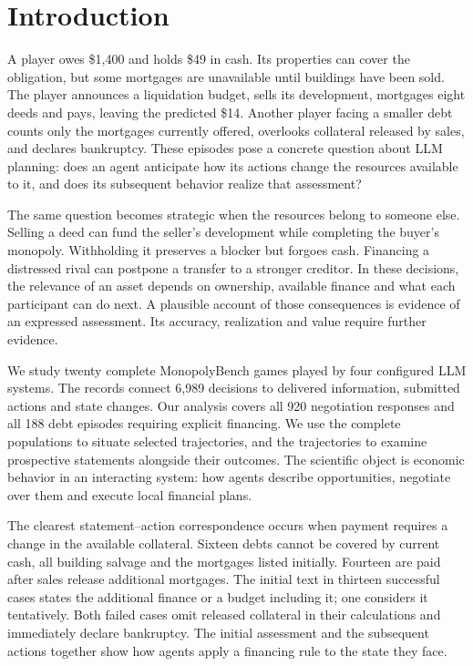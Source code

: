 \section{Introduction}

A player owes \$1,400 and holds \$49 in cash. Its properties can cover the obligation, but some mortgages are unavailable until buildings have been sold. The player announces a liquidation budget, sells its development, mortgages eight deeds and pays, leaving the predicted \$14. Another player facing a smaller debt counts only the mortgages currently offered, overlooks collateral released by sales, and declares bankruptcy. These episodes pose a concrete question about LLM planning: does an agent anticipate how its actions change the resources available to it, and does its subsequent behavior realize that assessment?

The same question becomes strategic when the resources belong to someone else. Selling a deed can fund the seller's development while completing the buyer's monopoly. Withholding it preserves a blocker but forgoes cash. Financing a distressed rival can postpone a transfer to a stronger creditor. In these decisions, the relevance of an asset depends on ownership, available finance and what each participant can do next. A plausible account of those consequences is evidence of an expressed assessment. Its accuracy, realization and value require further evidence.

We study twenty complete MonopolyBench games played by four configured LLM systems. The records connect 6,989 decisions to delivered information, submitted actions and state changes. Our analysis covers all 920 negotiation responses and all 188 debt episodes requiring explicit financing. We use the complete populations to situate selected trajectories, and the trajectories to examine prospective statements alongside their outcomes. The scientific object is economic behavior in an interacting system: how agents describe opportunities, negotiate over them and execute local financial plans.

The clearest statement--action correspondence occurs when payment requires a change in the available collateral. Sixteen debts cannot be covered by current cash, all building salvage and the mortgages listed initially. Fourteen are paid after sales release additional mortgages. The initial text in thirteen successful cases states the additional finance or a budget including it; one considers it tentatively. Both failed cases omit released collateral in their calculations and immediately declare bankruptcy. The initial assessment and the subsequent actions together show how agents apply a financing rule to the state they face.

